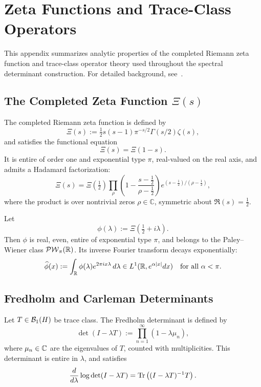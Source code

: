 \section{Zeta Functions and Trace-Class Operators}
\label{app:zeta_trace_background}

\noindent
This appendix summarizes analytic properties of the completed Riemann zeta function and trace-class operator theory used throughout the spectral determinant construction. For detailed background, see~\cite{Titchmarsh1986Zeta, Simon2005TraceIdeals, Bornemann2010FredholmDeterminants}.

\subsection*{The Completed Zeta Function \( \Xi(s) \)}

The completed Riemann zeta function is defined by
\[
\Xi(s) := \tfrac{1}{2}s(s-1)\pi^{-s/2}\Gamma(s/2)\zeta(s),
\]
and satisfies the functional equation
\[
\Xi(s) = \Xi(1 - s).
\]
It is entire of order one and exponential type \( \pi \), real-valued on the real axis, and admits a Hadamard factorization:
\[
\Xi(s) = \Xi\left(\tfrac{1}{2}\right) \prod_{\rho} \left(1 - \frac{s - \tfrac{1}{2}}{\rho - \tfrac{1}{2}}\right) e^{(s - \tfrac{1}{2})/(\rho - \tfrac{1}{2})},
\]
where the product is over nontrivial zeros \( \rho \in \mathbb{C} \), symmetric about \( \Re(s) = \tfrac{1}{2} \).

Let
\[
\phi(\lambda) := \Xi\left( \tfrac{1}{2} + i\lambda \right).
\]
Then \( \phi \) is real, even, entire of exponential type \( \pi \), and belongs to the Paley–Wiener class \( \mathcal{PW}_{\pi}(\mathbb{R}) \). Its inverse Fourier transform decays exponentially:
\[
\widehat{\phi}(x) := \int_{\mathbb{R}} \phi(\lambda) e^{2\pi i x \lambda} \, d\lambda
\in L^1(\mathbb{R}, e^{\alpha|x|}dx) \quad \text{for all } \alpha < \pi.
\]

\subsection*{Fredholm and Carleman Determinants}

Let \( T \in \mathcal{B}_1(H) \) be trace class. The Fredholm determinant is defined by
\[
\det(I - \lambda T) := \prod_{n=1}^\infty (1 - \lambda \mu_n),
\]
where \( \mu_n \in \mathbb{C} \) are the eigenvalues of \( T \), counted with multiplicities. This determinant is entire in \( \lambda \), and satisfies
\[
\frac{d}{d\lambda} \log \det(I - \lambda T) = \operatorname{Tr}\left((I - \lambda T)^{-1} T\right).
\]

